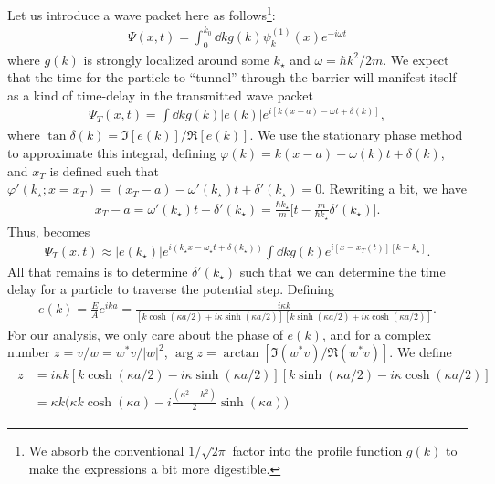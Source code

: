 {Let us introduce a wave packet here as follows\footnote{We absorb the conventional $1/\sqrt{2\pi}$ factor into the profile function $g(k)$ to make the expressions a bit more digestible.}:
\begin{eqnarray}
    \Psi(x,t) = \int_{0}^{k_0} \dd{k} g(k) \psi_{k}^{(1)}(x) e^{-i \omega t}
\end{eqnarray}
where $g(k)$ is strongly localized around some $k_{\star}$ and $\omega = \hbar k^2/2m$.
We expect that the time for the particle to ``tunnel'' through the barrier will manifest itself as a kind of time-delay in the transmitted wave packet
\begin{eqnarray}
    \label{eq:T-wave-packet}
    \Psi_{T}(x,t) = \int \dd{k} g(k) |e(k)| e^{i[k(x-a) - \omega t + \delta(k)]}
,\end{eqnarray}
where $\tan{\delta(k)} = \Im[e(k)]/\Re[e(k)]$.
We use the stationary phase method to approximate this integral, defining $\varphi(k) = k(x-a) - \omega(k) t + \delta(k)$, and $x_{T}$ is defined such that $\varphi'(k_{\star};x=x_{T}) = (x_{T} - a) - \omega'(k_{\star}) t + \delta'(k_{\star}) = 0$.
Rewriting a bit, we have
\begin{eqnarray}
    x_{T} - a = \omega'(k_{\star})t - \delta'(k_{\star}) = \frac{\hbar k_{\star}}{m} \Big[ t - \frac{m}{\hbar k_{\star}} \delta'(k_{\star}) \Big]
.\end{eqnarray}
Thus,  becomes
\begin{eqnarray}
    \Psi_{T}(x,t) \approx |e(k_{\star})| e^{i(k_{\star} x - \omega_{\star} t + \delta(k_{\star}))} \int \dd{k} g(k) e^{i[x - x_{T}(t)][k-k_{\star}]}
.\end{eqnarray}
All that remains is to determine $\delta'(k_{\star})$ such that we can determine the time delay for a particle to traverse the potential step.
Defining
\begin{eqnarray}
    e(k) = \frac{E}{A} e^{ika} = \frac{i \kappa k}{[k \cosh(\kappa a/2) + i\kappa \sinh(\kappa a/2)][k \sinh(\kappa a/2) + i\kappa \cosh(\kappa a/2)]}
.\end{eqnarray}
For our analysis, we only care about the phase of $e(k)$, and for a complex number $z = v/w = w^{*} v/|w|^2$, $\arg{z} = \arctan[\Im(w^{*}v)/\Re(w^{*}v)]$.
We define
\begin{eqnarray}
    \begin{aligned}
        z &= i \kappa k [k \cosh(\kappa a/2) - i\kappa \sinh(\kappa a/2)][k \sinh(\kappa a/2) - i\kappa \cosh(\kappa a/2)] \\
          &= \kappa k \Big( \kappa k \cosh(\kappa a) - i \frac{(\kappa^2 - k^2)}{2} \sinh(\kappa a) \Big)

\end{aligned}
\end{eqnarray}}
